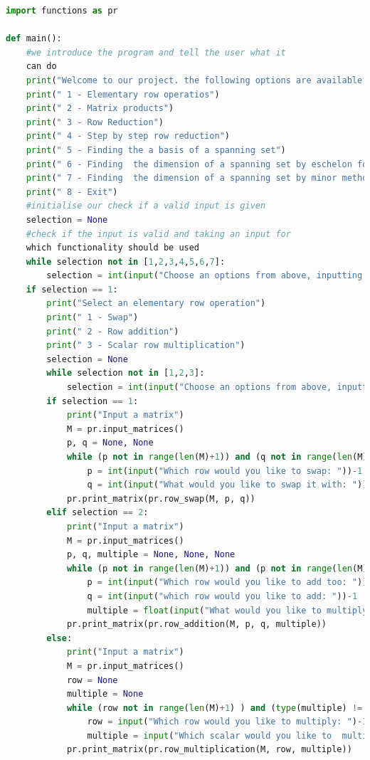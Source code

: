 \documentclass{article}
\begin{document}
\begin{lstlisting}[language=Python, caption=Text Interface, label=main]
import functions as pr

def main():
    #we introduce the program and tell the user what it 
    can do
    print("Welcome to our project. the following options are available in finding the dimension of a spanning set")
    print(" 1 - Elementary row operatios")
    print(" 2 - Matrix products")
    print(" 3 - Row Reduction")
    print(" 4 - Step by step row reduction")
    print(" 5 - Finding the a basis of a spanning set")
    print(" 6 - Finding  the dimension of a spanning set by eschelon form")
    print(" 7 - Finding  the dimension of a spanning set by minor method")
    print(" 8 - Exit")
    #initialise our check if a valid input is given
    selection = None
    #check if the input is valid and taking an input for 
    which functionality should be used
    while selection not in [1,2,3,4,5,6,7]:
        selection = int(input("Choose an options from above, inputting your answer as an integer: "))
    if selection == 1:
        print("Select an elementary row operation")
        print(" 1 - Swap")
        print(" 2 - Row addition")
        print(" 3 - Scalar row multiplication")
        selection = None
        while selection not in [1,2,3]:
            selection = int(input("Choose an options from above, inputting your answer as an integar: "))
        if selection == 1:
            print("Input a matrix")
            M = pr.input_matrices()
            p, q = None, None
            while (p not in range(len(M)+1)) and (q not in range(len(M)+1)):
                p = int(input("Which row would you like to swap: "))-1
                q = int(input("What would you like to swap it with: "))-1
            pr.print_matrix(pr.row_swap(M, p, q))
        elif selection == 2:
            print("Input a matrix")
            M = pr.input_matrices()
            p, q, multiple = None, None, None
            while (p not in range(len(M)+1)) and (p not in range(len(M)+1)) and (multiple != float):
                p = int(input("Which row would you like to add too: "))-1
                q = int(input("which row would you like to add: "))-1
                multiple = float(input("What would you like to multiply row " + q + " with before adding: "))
            pr.print_matrix(pr.row_addition(M, p, q, multiple))
        else:
            print("Input a matrix")
            M = pr.input_matrices()
            row = None
            multiple = None
            while (row not in range(len(M)+1) ) and (type(multiple) != float):
                row = input("Which row would you like to multiply: ")-1
                multiple = input("Which scalar would you like to  multiply by: ")
            pr.print_matrix(pr.row_multiplication(M, row, multiple))


\end{lstlisting}
\end{document}
